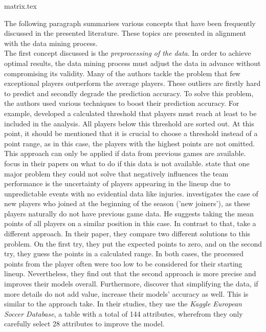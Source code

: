 {matrix.tex}

The following paragraph summarises various concepts that have been frequently discussed in the presented literature. These topics are presented in alignment with the data mining process.  \\
\indent The first concept discussed is the \emph{preprocessing of the data}. In order to achieve optimal results, the data mining process must adjust the data in advance without compromising its validity. Many of the authors tackle the problem that few exceptional players outperform the average players. These outliers are firstly hard to predict and secondly degrade the prediction accuracy. To solve this problem, the authors used various techniques to boost their prediction accuracy. For example, \citet{landers_machine_2017} developed a calculated threshold that players must reach at least to be included in the analysis. All players below this threshold are sorted out. At this point, it should be mentioned that it is crucial to choose a threshold instead of a point range, as in this case, the players with the highest points are not omitted. This approach can only be applied if data from previous games are available. \citet{lutz_fantasy_2015,egidi_bayesian_2018,yurko_nflwar_2019} focus in their papers on what to do if this data is not available. \citet{yurko_nflwar_2019} state that one major problem they could not solve that negatively influences the team performance is the uncertainty of players appearing in the lineup due to unpredictable events with no evidential data like injuries. \citet{lutz_fantasy_2015} investigates the case of new players who joined at the beginning of the season ('new joiners'), as these players naturally do not have previous game data. He suggests taking the mean points of all players on a similar position in this case. \parencite[cf.][, p. 3]{lutz_fantasy_2015} In contrast to that, \citet{egidi_bayesian_2018} take a different approach. In their paper, they compare two different solutions to this problem. On the first try, they put the expected points to zero, and on the second try, they guess the points in a calculated range. In both cases, the processed points from the player often were too low to be considered for their starting lineup. Nevertheless, they find out that the second approach is more precise and improves their models overall. Furthermore, \citet{egidi_bayesian_2018} discover that simplifying the data, if more details do not add value, increase their models' accuracy as well. This is similar to the approach \citet{deng_analysis_2020} take. In their studies, they use the \emph{Kaggle European Soccer Database}, a table with a total of 144 attributes, wherefrom they only carefully select 28 attributes to improve the model. \\
